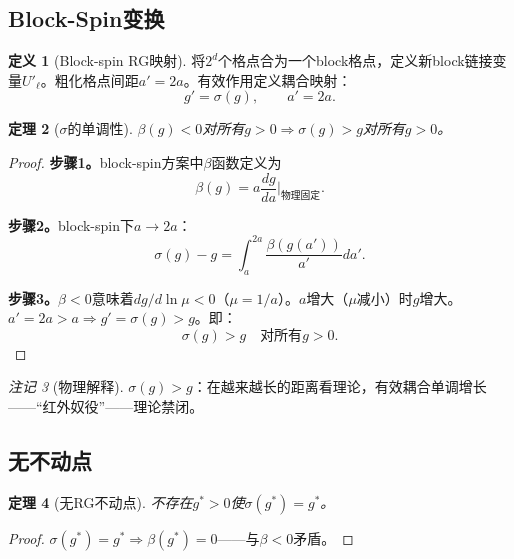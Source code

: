 \documentclass[12pt,a4paper]{article}
\theoremstyle{plain}
\newtheorem{theorem}{定理}[section]\newtheorem{lemma}[theorem]{引理}\newtheorem{corollary}[theorem]{推论}\newtheorem{proposition}[theorem]{命题}
\theoremstyle{definition}\newtheorem{definition}[theorem]{定义}
\theoremstyle{remark}\newtheorem{remark}[theorem]{注记}
\begin{document}
\subsection{Block-Spin变换}\label{sec:blockspin}
\begin{definition}[Block-spin RG映射]\label{def:blockspin}
将$2^d$个格点合为一个block格点，定义新block链接变量$U'_\ell$。粗化格点间距$a'=2a$。有效作用定义耦合映射：
\begin{equation}\label{eq:RGmap}
g'=\sigma(g),\qquad a'=2a.
\end{equation}
\end{definition}
\begin{theorem}[$\sigma$的单调性]\label{thm:monotone}
$\beta(g)<0$对所有$g>0\Rightarrow\sigma(g)>g$对所有$g>0$。
\end{theorem}
\begin{proof}
\textbf{步骤1。}block-spin方案中$\beta$函数定义为
\begin{equation}\label{eq:betaRG}
\beta(g) = a\frac{dg}{da}\bigg|_{\text{物理固定}}.
\end{equation}

\textbf{步骤2。}block-spin下$a\to 2a$：
\begin{equation}\label{eq:sigma_g}
\sigma(g)-g=\int_a^{2a}\frac{\beta(g(a'))}{a'}da'.
\end{equation}

\textbf{步骤3。}$\beta<0$意味着$dg/d\ln\mu<0$（$\mu=1/a$）。$a$增大（$\mu$减小）时$g$增大。$a'=2a>a\Rightarrow g'=\sigma(g)>g$。即：
\begin{equation}\label{eq:monotone}
\sigma(g)>g\quad\text{对所有}g>0.
\end{equation}
\end{proof}
\begin{remark}[物理解释]
$\sigma(g)>g$：在越来越长的距离看理论，有效耦合单调增长——``红外奴役''——理论禁闭。
\end{remark}
\subsection{无不动点}\label{sec:nofixed}
\begin{theorem}[无RG不动点]\label{thm:nofixed}
不存在$g^*>0$使$\sigma(g^*)=g^*$。
\end{theorem}
\begin{proof}
$\sigma(g^*)=g^*\Rightarrow\beta(g^*)=0$——与$\beta<0$矛盾。
\end{proof}
\end{document}
